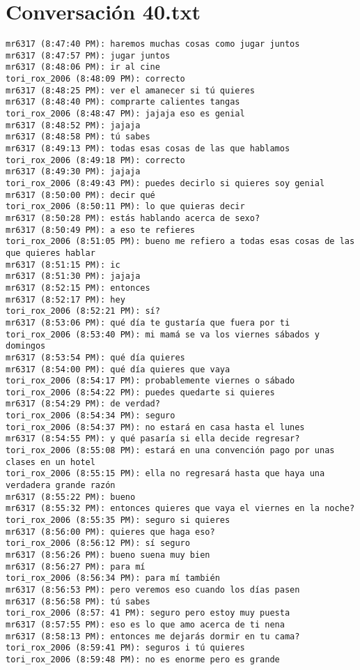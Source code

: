 \section{Conversaci\'on 40.txt}

\begin{verbatim}
mr6317 (8:47:40 PM): haremos muchas cosas como jugar juntos
mr6317 (8:47:57 PM): jugar juntos
mr6317 (8:48:06 PM): ir al cine
tori_rox_2006 (8:48:09 PM): correcto
mr6317 (8:48:25 PM): ver el amanecer si tú quieres
mr6317 (8:48:40 PM): comprarte calientes tangas
tori_rox_2006 (8:48:47 PM): jajaja eso es genial
mr6317 (8:48:52 PM): jajaja
mr6317 (8:48:58 PM): tú sabes
mr6317 (8:49:13 PM): todas esas cosas de las que hablamos
tori_rox_2006 (8:49:18 PM): correcto
mr6317 (8:49:30 PM): jajaja
tori_rox_2006 (8:49:43 PM): puedes decirlo si quieres soy genial
mr6317 (8:50:00 PM): decir qué
tori_rox_2006 (8:50:11 PM): lo que quieras decir
mr6317 (8:50:28 PM): estás hablando acerca de sexo?
mr6317 (8:50:49 PM): a eso te refieres
tori_rox_2006 (8:51:05 PM): bueno me refiero a todas esas cosas de las que quieres hablar
mr6317 (8:51:15 PM): ic
mr6317 (8:51:30 PM): jajaja
mr6317 (8:52:15 PM): entonces
mr6317 (8:52:17 PM): hey
tori_rox_2006 (8:52:21 PM): sí?
mr6317 (8:53:06 PM): qué día te gustaría que fuera por ti
tori_rox_2006 (8:53:40 PM): mi mamá se va los viernes sábados y domingos
mr6317 (8:53:54 PM): qué día quieres
mr6317 (8:54:00 PM): qué día quieres que vaya
tori_rox_2006 (8:54:17 PM): probablemente viernes o sábado
tori_rox_2006 (8:54:22 PM): puedes quedarte si quieres
mr6317 (8:54:29 PM): de verdad?
tori_rox_2006 (8:54:34 PM): seguro
tori_rox_2006 (8:54:37 PM): no estará en casa hasta el lunes
mr6317 (8:54:55 PM): y qué pasaría si ella decide regresar?
tori_rox_2006 (8:55:08 PM): estará en una convención pago por unas clases en un hotel
tori_rox_2006 (8:55:15 PM): ella no regresará hasta que haya una verdadera grande razón
mr6317 (8:55:22 PM): bueno
mr6317 (8:55:32 PM): entonces quieres que vaya el viernes en la noche?
tori_rox_2006 (8:55:35 PM): seguro si quieres
mr6317 (8:56:00 PM): quieres que haga eso?
tori_rox_2006 (8:56:12 PM): sí seguro
mr6317 (8:56:26 PM): bueno suena muy bien
mr6317 (8:56:27 PM): para mí
tori_rox_2006 (8:56:34 PM): para mí también
mr6317 (8:56:53 PM): pero veremos eso cuando los días pasen
mr6317 (8:56:58 PM): tú sabes
tori_rox_2006 (8:57: 41 PM): seguro pero estoy muy puesta
mr6317 (8:57:55 PM): eso es lo que amo acerca de ti nena
mr6317 (8:58:13 PM): entonces me dejarás dormir en tu cama?
tori_rox_2006 (8:59:41 PM): seguros i tú quieres
tori_rox_2006 (8:59:48 PM): no es enorme pero es grande

\end{verbatim}
